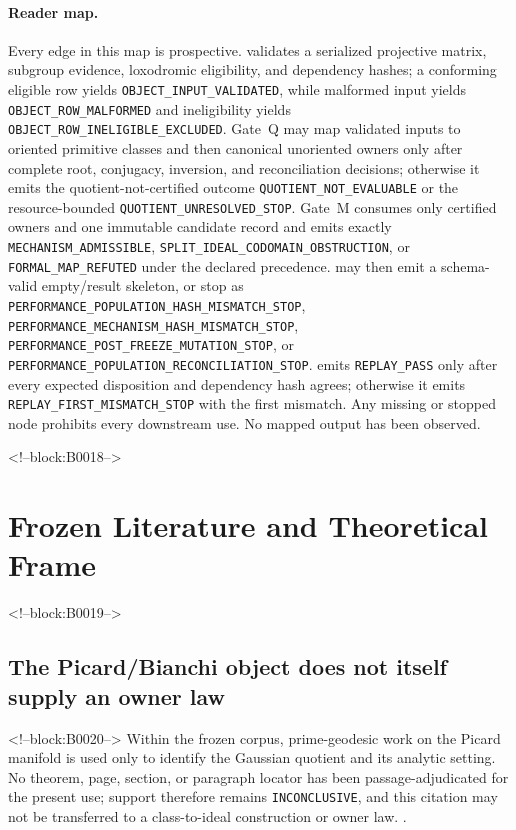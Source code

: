 \documentclass[11pt,a4paper]{article}
\begin{document}
\paragraph{Reader map.} Every edge in this map is prospective.  validates a serialized projective matrix, subgroup evidence, loxodromic eligibility, and dependency hashes; a conforming eligible row yields \texttt{OBJECT\_INPUT\_VALIDATED}, while malformed input yields \texttt{OBJECT\_ROW\_MALFORMED} and ineligibility yields \texttt{OBJECT\_ROW\_INELIGIBLE\_EXCLUDED}. Gate~Q may map validated inputs to oriented primitive classes and then canonical unoriented owners only after complete root, conjugacy, inversion, and reconciliation decisions; otherwise it emits the quotient-not-certified outcome \texttt{QUOTIENT\_NOT\_EVALUABLE} or the resource-bounded \texttt{QUOTIENT\_UNRESOLVED\_STOP}. Gate~M consumes only certified owners and one immutable candidate record and emits exactly \texttt{MECHANISM\_ADMISSIBLE}, \texttt{SPLIT\_\allowbreak{}IDEAL\_\allowbreak{}CODOMAIN\_\allowbreak{}OBSTRUCTION}, or \texttt{FORMAL\_MAP\_REFUTED} under the declared precedence.  may then emit a schema-valid empty/result skeleton, or stop as \texttt{PERFORMANCE\_POPULATION\_HASH\_MISMATCH\_STOP}, \texttt{PERFORMANCE\_\allowbreak{}MECHANISM\_\allowbreak{}HASH\_\allowbreak{}MISMATCH\_\allowbreak{}STOP}, \texttt{PERFORMANCE\_POST\_FREEZE\_MUTATION\_STOP}, or \texttt{PERFORMANCE\_\allowbreak{}POPULATION\_\allowbreak{}RECONCILIATION\_\allowbreak{}STOP}.  emits \texttt{REPLAY\_PASS} only after every expected disposition and dependency hash agrees; otherwise it emits \texttt{REPLAY\_\allowbreak{}FIRST\_\allowbreak{}MISMATCH\_\allowbreak{}STOP} with the first mismatch. Any missing or stopped node prohibits every downstream use. No mapped output has been observed.\par\endgroup

<!--block:B0018-->
\section{Frozen Literature and Theoretical Frame}

<!--block:B0019-->
\subsection{The Picard/Bianchi object does not itself supply an owner law}

<!--block:B0020-->
Within the frozen corpus, prime-geodesic work on the Picard manifold is used only to identify the Gaussian quotient and its analytic setting. No theorem, page, section, or paragraph locator has been passage-adjudicated for the present use; support therefore remains \texttt{INCONCLUSIVE}, and this citation may not be transferred to a class-to-ideal construction or owner law.
\citep{P29-S01}.
\end{document}
